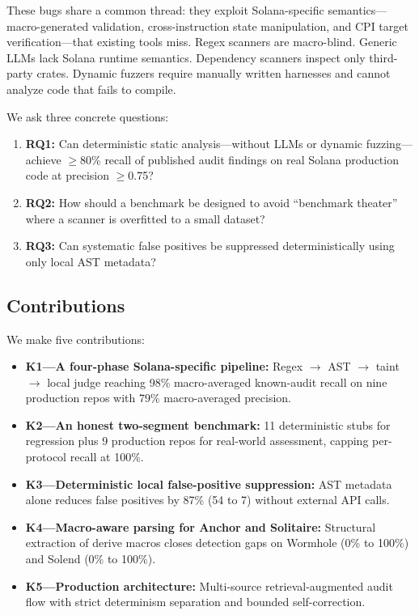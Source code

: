\documentclass[conference]{IEEEtran}
\begin{document}
These bugs share a common thread: they exploit Solana-specific semantics---macro-generated validation, cross-instruction state manipulation, and CPI target verification---that existing tools miss. Regex scanners are macro-blind. Generic LLMs lack Solana runtime semantics. Dependency scanners inspect only third-party crates. Dynamic fuzzers require manually written harnesses and cannot analyze code that fails to compile.

We ask three concrete questions:
\begin{enumerate}
  \item {\bf RQ1:} Can deterministic static analysis---without LLMs or dynamic fuzzing---achieve $\geq$80\% recall of published audit findings on real Solana production code at precision $\geq$0.75?
  \item {\bf RQ2:} How should a benchmark be designed to avoid ``benchmark theater'' where a scanner is overfitted to a small dataset?
  \item {\bf RQ3:} Can systematic false positives be suppressed deterministically using only local AST metadata?
\end{enumerate}

\subsection{Contributions}

We make five contributions:
\begin{itemize}
  \item {\bf K1---A four-phase Solana-specific pipeline:} Regex $\to$ AST $\to$ taint $\to$ local judge reaching 98\% macro-averaged known-audit recall on nine production repos with 79\% macro-averaged precision.
  \item {\bf K2---An honest two-segment benchmark:} 11 deterministic stubs for regression plus 9 production repos for real-world assessment, capping per-protocol recall at 100\%.
  \item {\bf K3---Deterministic local false-positive suppression:} AST metadata alone reduces false positives by 87\% (54 to 7) without external API calls.
  \item {\bf K4---Macro-aware parsing for Anchor and Solitaire:} Structural extraction of derive macros closes detection gaps on Wormhole (0\% to 100\%) and Solend (0\% to 100\%).
  \item {\bf K5---Production architecture:} Multi-source retrieval-augmented audit flow with strict determinism separation and bounded self-correction.
\end{itemize}
\end{document}
